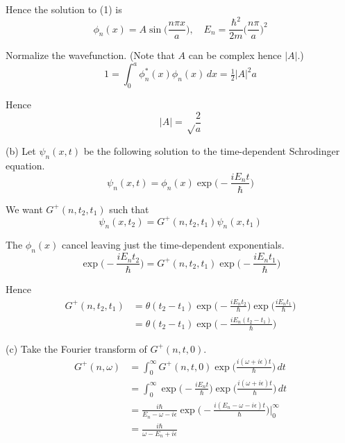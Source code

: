 Hence the solution to (1) is
\begin{equation*}
\phi_n(x)=A\sin\bigg(\frac{n\pi x}{a}\bigg),
\quad
E_n=\frac{\hbar^2}{2m}\bigg(\frac{n\pi}{a}\bigg)^2
\end{equation*}

Normalize the wavefunction.
(Note that $A$ can be complex hence $|A|$.)
\begin{equation*}
1=\int_0^a\phi_n^*(x)\phi_n(x)\,dx=\tfrac{1}{2}|A|^2a
\end{equation*}

Hence
\begin{equation*}
|A|=\sqrt\frac{2}{a}
\end{equation*}

(b) Let $\psi_n(x,t)$ be the following solution to the time-dependent Schrodinger equation.
\begin{equation*}
\psi_n(x,t)=\phi_n(x)\exp\bigg({-}\frac{iE_nt}{\hbar}\bigg)
\end{equation*}

We want $G^+(n,t_2,t_1)$ such that
\begin{equation*}
\psi_n(x,t_2)=G^+(n,t_2,t_1)\psi_n(x,t_1)
\end{equation*}

The $\phi_n(x)$ cancel leaving just the time-dependent exponentials.
\begin{equation*}
\exp\bigg({-}\frac{iE_nt_2}{\hbar}\bigg)=G^+(n,t_2,t_1)\exp\bigg({-}\frac{iE_nt_1}{\hbar}\bigg)
\end{equation*}

Hence
\begin{align*}
G^+(n,t_2,t_1)
&=\theta(t_2-t_1)\exp\bigg({-}\frac{iE_nt_2}{\hbar}\bigg)\exp\bigg(\frac{iE_nt_1}{\hbar}\bigg)
\\
&=\theta(t_2-t_1)\exp\bigg({-}\frac{iE_n(t_2-t_1)}{\hbar}\bigg)
\end{align*}

(c) Take the Fourier transform of $G^+(n,t,0)$.
\begin{align*}
G^+(n,\omega)&=\int_0^\infty G^+(n,t,0)\exp\bigg(\frac{i(\omega+i\epsilon)t}{\hbar}\bigg)\,dt
\\
&=\int_0^\infty\exp\bigg({-}\frac{iE_nt}{\hbar}\bigg)\exp\bigg(\frac{i(\omega+i\epsilon)t}{\hbar}\bigg)\,dt
\\
&=\frac{i\hbar}{E_n-\omega-i\epsilon}\exp\bigg({-}\frac{i(E_n-\omega-i\epsilon)t}{\hbar}\bigg)\bigg|_0^\infty
\\
&=\frac{i\hbar}{\omega-E_n+i\epsilon}
\end{align*}


